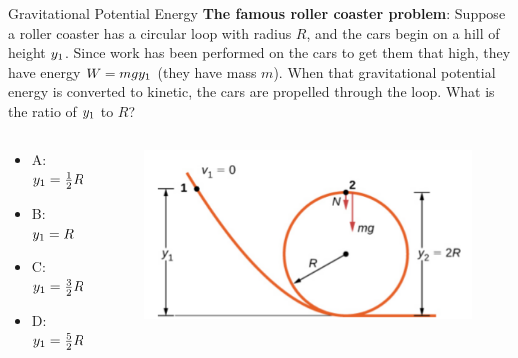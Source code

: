 \documentclass{beamer}
\begin{document}
\begin{frame}{Gravitational Potential Energy}
\textbf{The famous roller coaster problem}: Suppose a roller coaster has a circular loop with radius $R$, and the cars begin on a hill of height $y_{\rm 1}$.  Since work has been performed on the cars to get them that high, they have energy $W = mgy_{\rm 1}$ (they have mass $m$).  When that gravitational potential energy is converted to kinetic, the cars are propelled through the loop.  What is the ratio of $y_{\rm 1}$ to $R$? 
\begin{columns}[T]
\begin{column}{0.5\textwidth}
\begin{itemize}
\item A: $y_{\rm 1} = \frac{1}{2}R$
\item B: $y_{\rm 1} = R$
\item C: $y_{\rm 1} = \frac{3}{2}R$
\item D: $y_{\rm 1} = \frac{5}{2}R$
\end{itemize}
\end{column}
\begin{column}{0.5\textwidth}
\begin{figure}
\centering
\includegraphics[width=\textwidth]{figures/loop.png}
\end{figure}
\end{column}
\end{columns}
\end{frame}
\end{document}
